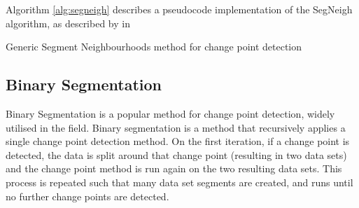 \documentclass[../main.tex]{subfiles}
\begin{document}
Algorithm \autoref{alg:segneigh} describes a pseudocode implementation of the SegNeigh algorithm, as described by \citeauthor{Eckley2011} in  \cite{Eckley2011}\newline

\begin{algorithm}[H]
\label{alg:segneigh}
    \caption{Generic Segment Neighbourhoods method for change point detection}
    \DontPrintSemicolon
        
    \bigskip
        
\end{algorithm}

\subsection{Binary Segmentation}

Binary Segmentation \cite{Jackson2003, Yao1984} is a popular method for change point detection, widely utilised in the field. Binary segmentation is a method that recursively applies a single change point detection method. On the first iteration, if a change point is detected, the data is split around that change point (resulting in two data sets) and the change point method is run again on the two resulting data sets. This process is repeated such that many data set segments are created, and runs until no further change points are detected.
\end{document}
